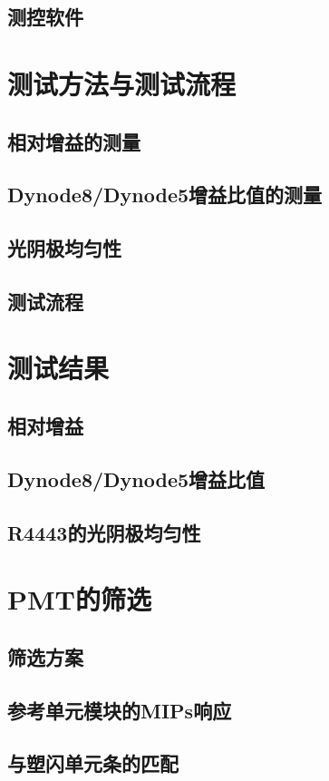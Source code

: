 \subsection{测控软件}


\section{测试方法与测试流程}
\subsection{相对增益的测量}
\subsection{Dynode8/Dynode5增益比值的测量}
\subsection{光阴极均匀性}
\subsection{测试流程}

\section{测试结果}
\subsection{相对增益}
\subsection{Dynode8/Dynode5增益比值}
\subsection{R4443的光阴极均匀性}

\section{PMT的筛选}
\subsection{筛选方案}

\subsection{参考单元模块的MIPs响应}
\subsection{与塑闪单元条的匹配}